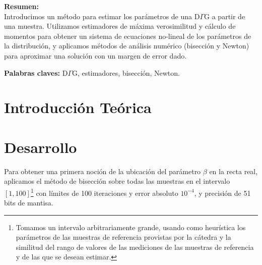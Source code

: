 \documentclass[a4paper,10pt,twoside]{article}
\begin{document}
\textbf{Resumen:} \\
Introducimos un método para estimar los parámetros de una D$\Gamma$G a partir de una muestra.
Utilizamos estimadores de máxima verosimilitud y cálculo de momentos para obtener un sistema
de ecuaciones no-lineal de los parámetros de la distribución, y aplicamos métodos de análisis
numérico (bisección y Newton) para aproximar una solución con un margen de error dado.

\textbf{Palabras claves:} D$\Gamma$G, estimadores, bisección, Newton.

\vspace{6cm}

\newpage




\tableofcontents

\newpage




\section{Introducción Teórica}

\blindtext




\section{Desarrollo}

Para obtener una primera noción de la ubicación del parámetro $\beta$ en la
recta real, aplicamos el método de bisección sobre todas las muestras en el
intervalo $[1, 100]$\footnote{Tomamos un intervalo arbitrariamente grande,
usando como heurística los parámetros de las muestras de referencia provistas
por la cátedra y la similitud del rango de valores de las mediciones de las
muestras de referencia y de las que se desean estimar.} con límites de 100
iteraciones y error absoluto $10^{-4}$, y precisión de 51 bits de mantisa.
\end{document}
